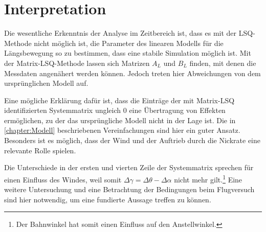 \section{Interpretation}

%
%
%

Die wesentliche Erkenntnis der Analyse im Zeitbereich ist, dass es mit der LSQ-Methode nicht möglich ist, die Parameter des 
linearen Modells für die Längsbewegung so zu bestimmen, dass eine stabile Simulation möglich ist. Mit der Matrix-LSQ-Methode 
lassen sich Matrizen $ A_L $ und $ B_L $ finden, mit denen die Messdaten angenähert werden können. Jedoch treten hier 
Abweichungen von dem ursprünglichen Modell auf.\par
Eine mögliche Erklärung dafür ist, dass die Einträge der mit Matrix-LSQ identifizierten Systemmatrix ungleich $ 0 $ eine 
Übertragung von Effekten ermöglichen, zu der das ursprüngliche Modell nicht in der Lage ist. Die in \cref{chapter:Modell} 
beschriebenen Vereinfachungen sind hier ein guter Ansatz. Besonders ist es möglich, dass der Wind und der Auftrieb durch die 
Nickrate eine relevante Rolle spielen. 

Die Unterschiede in der ersten und vierten Zeile der Systemmatrix sprechen für einen Einfluss des Windes, weil somit $\Delta 
\gamma = \Delta \theta - \Delta \alpha$ nicht mehr gilt.\footnote{Der Bahnwinkel hat somit einen Einfluss auf den 
Anstellwinkel.}
Eine weitere Untersuchung und eine Betrachtung der Bedingungen beim Flugversuch sind hier notwendig, um eine fundierte 
Aussage treffen zu können.
